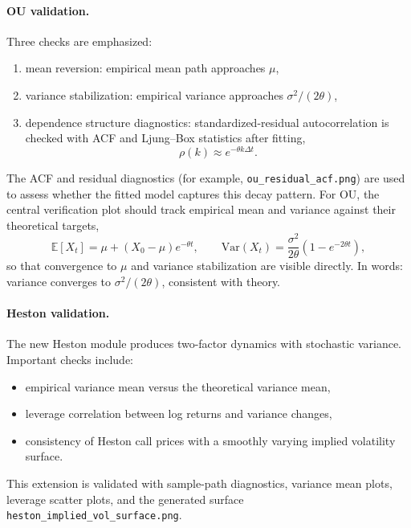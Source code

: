 \documentclass[11pt]{article}
\newcommand{\E}{\mathbb{E}}
\newcommand{\Var}{\mathrm{Var}}
\begin{document}
\paragraph{OU validation.}
Three checks are emphasized:
\begin{enumerate}[leftmargin=1.5em]
  \item mean reversion: empirical mean path approaches $\mu$,
  \item variance stabilization: empirical variance approaches $\sigma^2/(2\theta)$,
  \item dependence structure diagnostics: standardized-residual autocorrelation is checked with ACF and Ljung--Box statistics after fitting,
  \begin{equation*}
    \rho(k) \approx e^{-\theta k\Delta t}.
  \end{equation*}
\end{enumerate}
The ACF and residual diagnostics (for example, \texttt{ou\_residual\_acf.png}) are used to assess whether the fitted model captures this decay pattern. For OU, the central verification plot should track empirical mean and variance against their theoretical targets,
\begin{equation}
  \E[X_t] = \mu + (X_0-\mu)e^{-\theta t},
  \qquad
  \Var(X_t)=\frac{\sigma^2}{2\theta}\left(1-e^{-2\theta t}\right),
\end{equation}
so that convergence to $\mu$ and variance stabilization are visible directly. In words: variance converges to $\sigma^2/(2\theta)$, consistent with theory.

\paragraph{Heston validation.}
The new Heston module produces two-factor dynamics with stochastic variance. Important checks include:
\begin{itemize}[leftmargin=1.2em]
  \item empirical variance mean versus the theoretical variance mean,
  \item leverage correlation between log returns and variance changes,
  \item consistency of Heston call prices with a smoothly varying implied volatility surface.
\end{itemize}
This extension is validated with sample-path diagnostics, variance mean plots, leverage scatter plots, and the generated surface \texttt{heston\_implied\_vol\_surface.png}.
\end{document}
